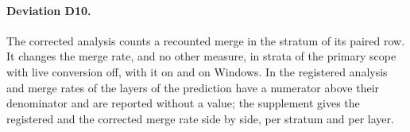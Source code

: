 \paragraph{Deviation D10.} The corrected analysis counts a recounted merge in the stratum of its paired row. It
changes the merge rate, and no other measure, in  strata of the
primary scope with live conversion off,  with it on and
 on Windows. In the registered analysis
 and  merge rates of the
layers of the prediction have a numerator above their denominator and are reported without a value; the supplement
gives the registered and the corrected merge rate side by side, per stratum and per layer.

